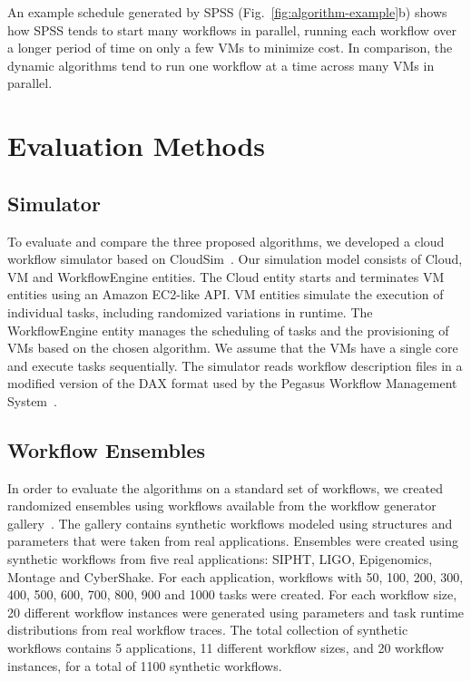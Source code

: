 \documentclass[conference]{IEEEtran}
\begin{document}
An example schedule generated by SPSS (Fig.~\ref{fig:algorithm-example}b)
shows how SPSS tends to start many workflows in parallel, running each workflow
over a longer period of time on only a few VMs to minimize cost. In comparison,
the dynamic algorithms tend to run one workflow at a time across many VMs in
parallel.


\section{Evaluation Methods}
\label{sec:performance}


\subsection{Simulator}

To evaluate and compare the three proposed algorithms, we developed a cloud
workflow simulator based on CloudSim~\cite{Calheiros2011}. Our simulation model
consists of Cloud, VM and WorkflowEngine entities. The Cloud entity starts and
terminates VM entities using an Amazon EC2-like API. VM entities simulate the
execution of individual tasks, including randomized variations in runtime. The
WorkflowEngine entity manages the scheduling of tasks and the provisioning of 
VMs based on the chosen algorithm. We assume that the VMs have a single core
and execute tasks sequentially. 
The simulator reads workflow description files in
a modified version of the DAX format used by the Pegasus Workflow Management
System~\cite{Deelman2005}. 


\subsection{Workflow Ensembles}
\label{sec:ensembles}


In order to evaluate the algorithms on a standard set of workflows, we created
randomized ensembles using workflows available from the workflow generator
gallery~\cite{WorkflowGenerator}. 
The
gallery contains synthetic workflows modeled using structures and parameters
that were taken from real applications. Ensembles were created using synthetic
workflows from five real applications: SIPHT, LIGO, Epigenomics, Montage and
CyberShake. For each application, workflows with 50, 100, 200, 300,
400, 500, 600, 700, 800, 900 and 1000 tasks were created. For each workflow
size, 20 different workflow instances were generated using parameters and task
runtime distributions from real workflow traces. The total collection of
synthetic workflows contains 5 applications, 11 different workflow sizes, and 20
workflow instances, for a total of 1100 synthetic workflows.
\end{document}
